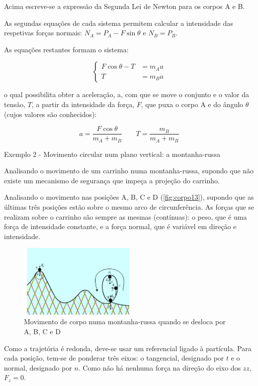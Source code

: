 \documentclass[a4paper,11pt,oneside]{report}
\begin{document}
Acima escreve-se a expressão da Segunda Lei de Newton para os corpos A e B.

As segundas equações de cada sistema permitem calcular a intensidade das respetivas 
forças normais: $N_A = P_A - F \sin \theta$ e $N_B = P_B$.

As equações restantes formam o sistema:

\[
\left\{
\begin{array}{cl}
F \cos \theta - T & = m_Aa \\
T & = m_Ba
\end{array}
\right.
\]

\noindent o qual possibilita obter a aceleração, a, com que se move o conjunto e o 
valor da tensão, $T$, a partir da intensidade da força, $F$, que puxa o corpo A e do 
ângulo $\theta$ (cujos valores são conhecidos): 

\[
a = \frac{F\cos\theta}{m_A+m_B} \qquad T = \frac{m_B}{m_A+m_B}
\]

\begin{center}
    Exemplo 2 - Movimento circular num plano vertical: a montanha-russa
\end{center}

Analisando o movimento de um carrinho numa montanha-russa, supondo que não existe 
um mecanismo de segurança que impeça a projeção do carrinho.

Analisando o movimento nas posições A, B, C e D (\autoref{fig:corpo13}), supondo que as últimas 
três posições estão sobre o mesmo arco de circunferência. As forças que se realizam 
sobre o carrinho são sempre as mesmas (contínuas): o peso, que é uma força de intensidade 
constante, e a força normal, que é variável em direção e intensidade.

\begin{figure}[H]
    \center
    \includegraphics[height=100pt]{figuras/mvmr.png}
    \caption{Movimento de corpo numa montanha-russa quando se desloca por A, B, C e D}
    \label{fig:corpo13}
\end{figure}

Como a trajetória é redonda, deve-se usar um referencial ligado à partícula. Para cada 
posição, tem-se de ponderar três eixos: o tangencial, designado por $t$ e o normal, 
designado por $n$. Como não há nenhuma força na direção do eixo dos $zz$, $F_z=0$.
\end{document}
